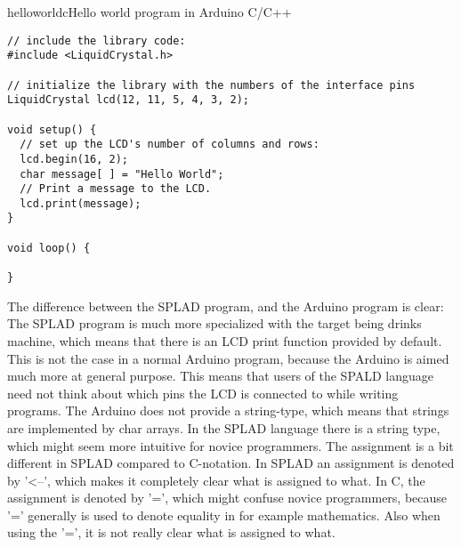 \begin{code}{helloworldc}{Hello world program in Arduino C/C++}
\begin{lstlisting}
// include the library code:
#include <LiquidCrystal.h>

// initialize the library with the numbers of the interface pins
LiquidCrystal lcd(12, 11, 5, 4, 3, 2);

void setup() {
  // set up the LCD's number of columns and rows: 
  lcd.begin(16, 2);
  char message[ ] = "Hello World";
  // Print a message to the LCD.
  lcd.print(message);
}

void loop() {

}
\end{lstlisting}
\end{code}
The difference between the SPLAD program, and the Arduino program is clear: The SPLAD program is much more specialized with the target being drinks machine, which means that there is an LCD print function provided by default. This is not the case in a normal Arduino program, because the Arduino is aimed much more at general purpose. This means that users of the SPALD language need not think about which pins the LCD is connected to while writing programs. The Arduino does not provide a string-type, which means that strings are implemented by char arrays. In the SPLAD language there is a string type, which might seem more intuitive for novice programmers. The assignment is a bit different in SPLAD compared to C-notation. In SPLAD an assignment is denoted by '<--', which makes it completely clear what is assigned to what. In C, the assignment is denoted by '=', which might confuse novice programmers, because '=' generally is used to denote equality in for example mathematics. Also when using the '=', it is not really clear what is assigned to what.